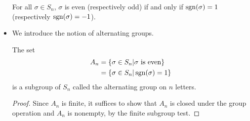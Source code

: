 \begin{itemize}
    \begin{corollary}
        For all $\sigma \in S_n$, $\sigma$ is even (respectively odd) if and only if $\operatorname{sgn}(\sigma) = 1$ (respectively $\operatorname{sgn}(\sigma)=-1$).
    \end{corollary}
    \item We introduce the notion of alternating groups.
    \begin{definition}
        The set
        \begin{align}
            A_n &= \{\sigma \in S_n | \sigma\text{ is even}\} \\ 
            &= \{\sigma \in S_n | \operatorname{sgn}(\sigma) = 1\}
        \end{align}
        is a subgroup of $S_n$ called the alternating group on $n$ letters.
    \end{definition}
    \begin{proof}
        Since $A_n$ is finite, it suffices to show that $A_n$ is closed under the group operation and $A_n$ is nonempty, by the finite subgroup test.


\end{proof}
\end{itemize}
